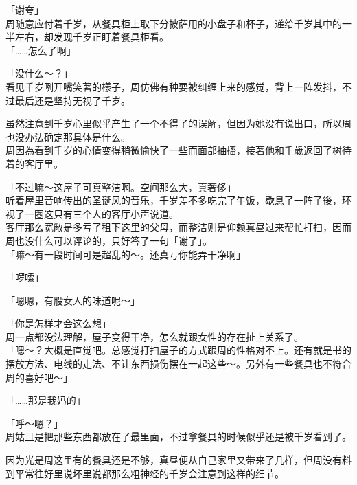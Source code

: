 「谢夸」\\

周随意应付着千岁，从餐具柜上取下分披萨用的小盘子和杯子，递给千岁其中的一半左右，却发现千岁正盯着餐具柜看。\\

「……怎么了啊」

「没什么～？」\\

看见千岁咧开嘴笑著的樣子，周仿佛有种要被纠缠上来的感觉，背上一阵发抖，不过最后还是坚持无视了千岁。

虽然注意到千岁心里似乎产生了一个不得了的误解，但因为她没有说出口，所以周也没办法确定那具体是什么。\\

周因為看到千岁的心情变得稍微愉快了一些而面部抽搐，接著他和千歲返回了树待着的客厅里。\\

\vspace{2\baselineskip}

「不过嘛～这屋子可真整洁啊。空间那么大，真奢侈」\\

听着屋里音响传出的圣诞风的音乐，千岁差不多吃完了午饭，歇息了一阵子後，环视了一圈这只有三个人的客厅小声说道。\\

客厅那么宽敞是多亏了租下这里的父母，而整洁则是仰赖真昼过来帮忙打扫，因而周也没什么可以评论的，只好答了一句「谢了」。\\

「嘛～有一段时间可是超乱的～。还真亏你能弄干净啊」

「啰嗦」

「嗯嗯，有股女人的味道呢～」

「你是怎样才会这么想」\\

周一点都没法理解，屋子变得干净，怎么就跟女性的存在扯上关系了。\\

「嗯～？大概是直觉吧。总感觉打扫屋子的方式跟周的性格对不上。还有就是书的摆放方法、电线的走法、不让东西损伤摆在一起这些～。另外有一些餐具也不符合周的喜好吧～」

「……那是我妈的」

「呼～嗯？」\\

周姑且是把那些东西都放在了最里面，不过拿餐具的时候似乎还是被千岁看到了。

因为光是周这里有的餐具还是不够，真昼便从自己家里又带来了几样，但周没有料到平常往好里说坏里说都那么粗神经的千岁会注意到这样的细节。\\

